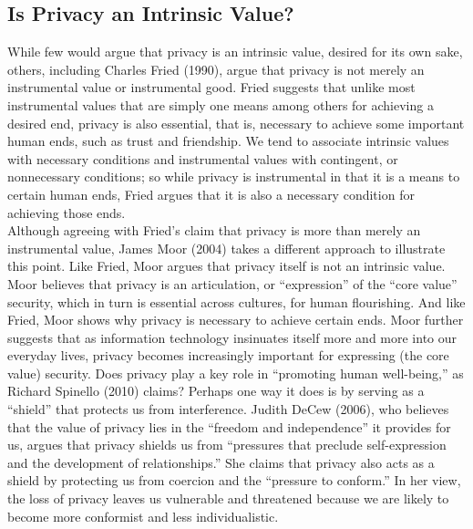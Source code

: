 \documentclass[12pt]{article}
\theoremstyle{definition}
\begin{document}
\subsection{Is Privacy an Intrinsic Value?}
While few would argue that privacy is an intrinsic value, desired for its own sake, others, including Charles Fried (1990), argue that privacy is not merely an instrumental value or instrumental good. Fried suggests that unlike most instrumental values that are simply one means among others for achieving a desired end, privacy is also essential, that is, necessary to achieve some important human ends, such as trust and friendship. We tend to associate intrinsic values with necessary conditions and instrumental values with contingent, or nonnecessary conditions; so while privacy is instrumental in that it is a means to certain human ends, Fried argues that it is also a necessary condition for achieving those ends.\\
Although agreeing with Fried’s claim that privacy is more than merely an instrumental value, James Moor (2004) takes a different approach to illustrate this point. Like Fried, Moor argues that privacy itself is not an intrinsic value. Moor believes that privacy is an articulation, or “expression” of the “core value” security, which in turn is essential
across cultures, for human flourishing. And like Fried, Moor shows why privacy is necessary to achieve certain ends. Moor further suggests that as information technology insinuates itself more and more into our everyday lives, privacy becomes increasingly important for expressing (the core value) security.
Does privacy play a key role in “promoting human well-being,” as Richard Spinello (2010) claims? Perhaps one way it does is by serving as a “shield” that protects us from interference. Judith DeCew (2006), who believes that the value of privacy lies in the “freedom and independence” it provides for us, argues that privacy shields us from “pressures that preclude self-expression and the development of relationships.” She claims that privacy also acts as a shield by protecting us from coercion and the “pressure to conform.” In her view, the loss of privacy leaves us vulnerable and threatened because we are likely to become more conformist and less individualistic.
\end{document}
